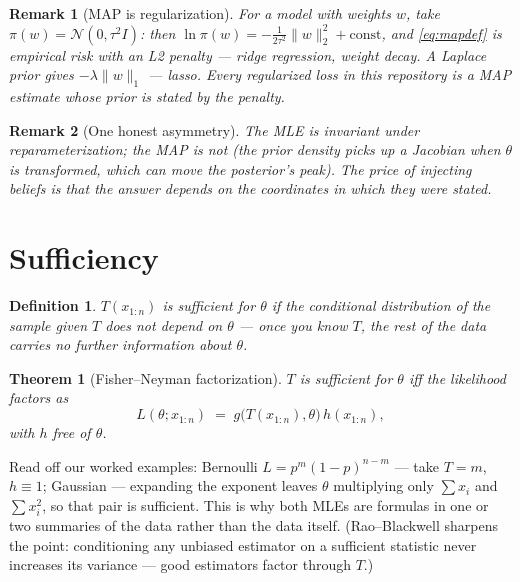 \documentclass[11pt]{article}
\newtheorem{theorem}{Theorem}
\newtheorem{definition}{Definition}
\newtheorem{remark}{Remark}
\begin{document}
\begin{remark}[MAP is regularization]
For a model with weights $w$, take
$\pi(w) = \mathcal{N}(0, \tau^2 I)$: then
$\ln\pi(w) = -\tfrac{1}{2\tau^2}\lVert w \rVert_2^2 + \text{const}$,
and \eqref{eq:mapdef} is empirical risk with an L2 penalty --- ridge
regression, weight decay. A Laplace prior gives
$-\lambda \lVert w\rVert_1$ --- lasso. Every regularized loss in this
repository is a MAP estimate whose prior is stated by the penalty.
\end{remark}

\begin{remark}[One honest asymmetry]
The MLE is invariant under reparameterization; the MAP is \emph{not}
(the prior density picks up a Jacobian when $\theta$ is transformed,
which can move the posterior's peak). The price of injecting beliefs is
that the answer depends on the coordinates in which they were stated.
\end{remark}

\section{Sufficiency}

\begin{definition}
$T(x_{1:n})$ is \emph{sufficient} for $\theta$ if the conditional
distribution of the sample given $T$ does not depend on $\theta$ ---
once you know $T$, the rest of the data carries no further information
about $\theta$.
\end{definition}

\begin{theorem}[Fisher--Neyman factorization]
$T$ is sufficient for $\theta$ iff the likelihood factors as
\begin{equation}
  L(\theta; x_{1:n}) \;=\; g\bigl(T(x_{1:n}), \theta\bigr)\,h(x_{1:n}),
  \label{eq:factorization}
\end{equation}
with $h$ free of $\theta$.
\end{theorem}

Read off our worked examples: Bernoulli
$L = p^m(1-p)^{n-m}$ --- take $T=m$, $h\equiv 1$; Gaussian --- expanding
the exponent leaves $\theta$ multiplying only $\sum x_i$ and
$\sum x_i^2$, so that pair is sufficient. This is why both MLEs are
formulas in one or two summaries of the data rather than the data itself.
(Rao--Blackwell sharpens the point: conditioning any unbiased estimator on
a sufficient statistic never increases its variance --- good estimators
factor through $T$.)
\end{document}
